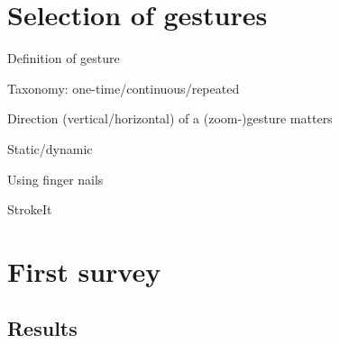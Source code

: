 \documentclass{aes130}
\begin{document}
\section{Selection of gestures} \label{sec:Gestures}

\newcommand{\quarterpic}[1][]{\texttt{[image: ../../de/Befragung/img/\#1]}}
\newcommand{\sixthpic}[1][]{\texttt{[image: ../../de/Befragung/img/\#1]}}

Definition of gesture

Taxonomy: one-time/continuous/repeated

Direction (vertical/horizontal) of a (zoom-)gesture matters

Static/dynamic

Using finger nails

StrokeIt


\section{First survey} \label{sec:Survey1}


\subsection{Results} \label{sec:Survey1Results}
\end{document}
